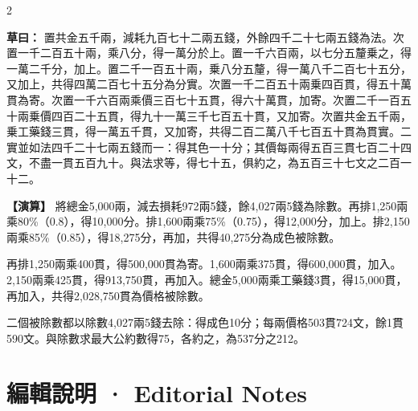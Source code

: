 \documentclass[11pt,a4paper]{article}
\newcommand{\ClassicalWorking}[1]{\par\noindent\textbf{草曰：}#1\par}
\newcommand{\ModernWorking}[1]{\par\noindent\textbf{【演算】}#1\par}
\begin{document}
\begin{paracol}{2}

\ClassicalWorking{%
置共金五千兩，減耗九百七十二兩五錢，外餘四千二十七兩五錢為法。次置一千二百五十兩，乘八分，得一萬分於上。置一千六百兩，以七分五釐乗之，得一萬二千分，加上。置二千一百五十兩，乗八分五釐，得一萬八千二百七十五分，又加上，共得四萬二百七十五分為分實。次置一千二百五十兩乗四百貫，得五十萬貫為寄。次置一千六百兩乘價三百七十五貫，得六十萬貫，加寄。次置二千一百五十兩乗價四百二十五貫，得九十一萬三千七百五十貫，又加寄。次置共金五千兩，乗工藥錢三貫，得一萬五千貫，又加寄，共得二百二萬八千七百五十貫為貫實。二實並如法四千二十七兩五錢而一：得其色一十分；其價每兩得五百三貫七百二十四文，不盡一貫五百九十。與法求等，得七十五，俱約之，為五百三十七文之二百一十二。}

\switchcolumn

\ModernWorking{%
將總金5,000兩，減去損耗972兩5錢，餘4,027兩5錢為除數。再排1,250兩乘80\%（0.8），得10,000分。排1,600兩乘75\%（0.75），得12,000分，加上。排2,150兩乘85\%（0.85），得18,275分，再加，共得40,275分為成色被除數。

再排1,250兩乘400貫，得500,000貫為寄。1,600兩乘375貫，得600,000貫，加入。2,150兩乘425貫，得913,750貫，再加入。總金5,000兩乘工藥錢3貫，得15,000貫，再加入，共得2,028,750貫為價格被除數。

二個被除數都以除數4,027兩5錢去除：得成色10分；每兩價格503貫724文，餘1貫590文。與除數求最大公約數得75，各約之，為537分之212。
}

\end{paracol}



\newpage
\section*{\color{titlecolor}編輯說明 · Editorial Notes}
\end{document}
